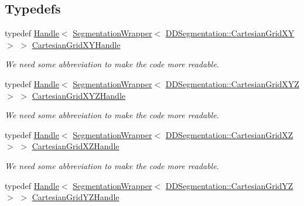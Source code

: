 \subsection*{Typedefs}
\begin{DoxyCompactItemize}
\item 
typedef \hyperlink{class_d_d4hep_1_1_handle}{Handle}$<$ \hyperlink{class_d_d4hep_1_1_geometry_1_1_segmentation_wrapper}{Segmentation\+Wrapper}$<$ \hyperlink{class_d_d4hep_1_1_d_d_segmentation_1_1_cartesian_grid_x_y}{D\+D\+Segmentation\+::\+Cartesian\+Grid\+XY} $>$ $>$ \hyperlink{namespace_d_d4hep_1_1_geometry_a3d6ee3d4ad1e20c15b726ca41f8f3b59}{Cartesian\+Grid\+X\+Y\+Handle}
\begin{DoxyCompactList}\small\item\em We need some abbreviation to make the code more readable. \end{DoxyCompactList}\item 
typedef \hyperlink{class_d_d4hep_1_1_handle}{Handle}$<$ \hyperlink{class_d_d4hep_1_1_geometry_1_1_segmentation_wrapper}{Segmentation\+Wrapper}$<$ \hyperlink{class_d_d4hep_1_1_d_d_segmentation_1_1_cartesian_grid_x_y_z}{D\+D\+Segmentation\+::\+Cartesian\+Grid\+X\+YZ} $>$ $>$ \hyperlink{namespace_d_d4hep_1_1_geometry_ae299410d519f2026e72fd36ea6967324}{Cartesian\+Grid\+X\+Y\+Z\+Handle}
\begin{DoxyCompactList}\small\item\em We need some abbreviation to make the code more readable. \end{DoxyCompactList}\item 
typedef \hyperlink{class_d_d4hep_1_1_handle}{Handle}$<$ \hyperlink{class_d_d4hep_1_1_geometry_1_1_segmentation_wrapper}{Segmentation\+Wrapper}$<$ \hyperlink{class_d_d4hep_1_1_d_d_segmentation_1_1_cartesian_grid_x_z}{D\+D\+Segmentation\+::\+Cartesian\+Grid\+XZ} $>$ $>$ \hyperlink{namespace_d_d4hep_1_1_geometry_a3ae1751ca0d9c7d138f97af6c2caedbc}{Cartesian\+Grid\+X\+Z\+Handle}
\begin{DoxyCompactList}\small\item\em We need some abbreviation to make the code more readable. \end{DoxyCompactList}\item 
typedef \hyperlink{class_d_d4hep_1_1_handle}{Handle}$<$ \hyperlink{class_d_d4hep_1_1_geometry_1_1_segmentation_wrapper}{Segmentation\+Wrapper}$<$ \hyperlink{class_d_d4hep_1_1_d_d_segmentation_1_1_cartesian_grid_y_z}{D\+D\+Segmentation\+::\+Cartesian\+Grid\+YZ} $>$ $>$ \hyperlink{namespace_d_d4hep_1_1_geometry_afd3542602caa1ff9674c251a7747b0f6}{Cartesian\+Grid\+Y\+Z\+Handle}

\end{DoxyCompactItemize}
